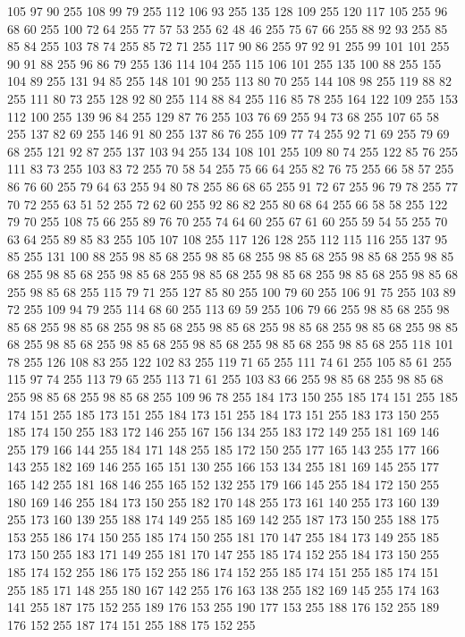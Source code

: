 105 97 90 255 108 99 79 255 112 106 93 255 135 128 109 255 120 117 105 255 96 68 60 255 100 72 64 255 77 57 53 255 62 48 46 255 75 67 66 255 88 92 93 255 85 85 84 255 103 78 74 255 85 72 71 255 117 90 86 255 97 92 91 255 99 101 101 255 90 91 88 255 96 86 79 255 136 114 104 255 115 106 101 255 135 100 88 255 155 104 89 255 131 94 85 255 148 101 90 255 113 80 70 255 144 108 98 255 119 88 82 255 111 80 73 255 128 92 80 255 114 88 84 255 116 85 78 255 164 122 109 255 153 112 100 255 139 96 84 255 129 87 76 255 103 76 69 255 94 73 68 255 107 65 58 255 137 82 69 255 146 91 80 255 137 86 76 255 109 77 74 255 92 71 69 255 79 69 68 255 121 92 87 255 137 103 94 255 134 108 101 255 109 80 74 255 122 85 76 255 111 83 73 255 103 83 72 255 70 58 54 255 75 66 64 255 82 76 75 255 66 58 57 255 86 76 60 255 79 64 63 255 94 80 78 255 86 68 65 255 91 72 67 255 96 79 78 255 77 70 72 255 63 51 52 255
72 62 60 255 92 86 82 255 80 68 64 255 66 58 58 255 122 79 70 255 108 75 66 255 89 76 70 255 74 64 60 255 67 61 60 255 59 54 55 255 70 63 64 255 89 85 83 255 105 107 108 255 117 126 128 255 112 115 116 255 137 95 85 255 131 100 88 255 98 85 68 255 98 85 68 255 98 85 68 255 98 85 68 255 98 85 68 255 98 85 68 255 98 85 68 255 98 85 68 255 98 85 68 255 98 85 68 255 98 85 68 255 98 85 68 255 115 79 71 255 127 85 80 255 100 79 60 255 106 91 75 255 103 89 72 255 109 94 79 255 114 68 60 255 113 69 59 255 106 79 66 255 98 85 68 255 98 85 68 255 98 85 68 255 98 85 68 255 98 85 68 255 98 85 68 255 98 85 68 255 98 85 68 255 98 85 68 255 98 85 68 255 98 85 68 255 98 85 68 255 98 85 68 255 118 101 78 255 126 108 83 255 122 102 83 255 119 71 65 255 111 74 61 255 105 85 61 255 115 97 74 255 113 79 65 255 113 71 61 255 103 83 66 255 98 85 68 255 98 85 68 255 98 85 68 255
98 85 68 255 109 96 78 255 184 173 150 255 185 174 151 255 185 174 151 255 185 173 151 255 184 173 151 255 184 173 151 255 183 173 150 255 185 174 150 255 183 172 146 255 167 156 134 255 183 172 149 255 181 169 146 255 179 166 144 255 184 171 148 255 185 172 150 255 177 165 143 255 177 166 143 255 182 169 146 255 165 151 130 255 166 153 134 255 181 169 145 255 177 165 142 255 181 168 146 255 165 152 132 255 179 166 145 255 184 172 150 255 180 169 146 255 184 173 150 255 182 170 148 255 173 161 140 255 173 160 139 255 173 160 139 255 188 174 149 255 185 169 142 255 187 173 150 255 188 175 153 255 186 174 150 255 185 174 150 255 181 170 147 255 184 173 149 255 185 173 150 255 183 171 149 255 181 170 147 255 185 174 152 255 184 173 150 255 185 174 152 255 186 175 152 255 186 174 152 255 185 174 151 255 185 174 151 255 185 171 148 255 180 167 142 255 176 163 138 255 182 169 145 255 174 163 141 255 187 175 152 255 189 176 153 255 190 177 153 255 188 176 152 255 189 176 152 255 187 174 151 255 188 175 152 255
